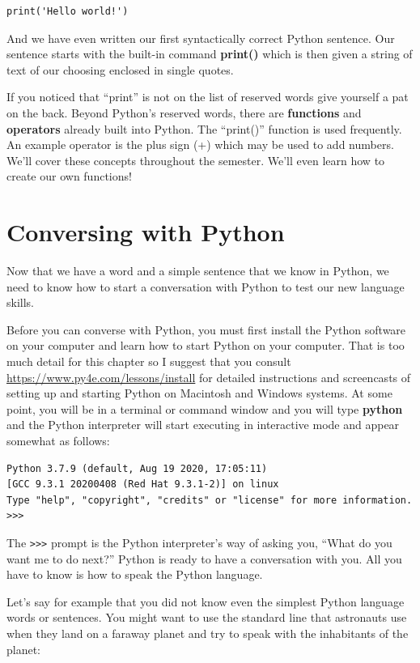 \beforeverb
\begin{verbatim}
print('Hello world!')
\end{verbatim}
\afterverb

And we have even written our first syntactically correct Python sentence.
Our sentence starts with the built-in command {\bf print()} which is then given
a string of text of our choosing enclosed in single quotes. 

If you noticed that ``print'' is not on the list of reserved words give yourself a pat on the back. Beyond Python's reserved words, there are {\bf functions} and {\bf operators} already built into Python. The ``print()'' function is used frequently. An example operator is the plus sign (+) which may be used to add numbers. We'll cover these concepts throughout the semester. We'll even learn how to create our own functions!

\section{Conversing with Python}

Now that we have a word and a simple sentence that we know in Python,
we need to know how to start a conversation with Python to test 
our new language skills.

Before you can converse with Python, you must first install the Python
software on your computer and learn how to start Python on your 
computer.  That is too much detail for this chapter so I suggest
that you consult \url{https://www.py4e.com/lessons/install} for detailed
instructions and screencasts of setting up and starting Python 
on Macintosh and Windows systems.  At some point, you will be in 
a terminal or command window and you will type {\bf python} and 
the Python interpreter will start executing in interactive mode
and appear somewhat as follows:

\beforeverb
\begin{verbatim}
Python 3.7.9 (default, Aug 19 2020, 17:05:11) 
[GCC 9.3.1 20200408 (Red Hat 9.3.1-2)] on linux
Type "help", "copyright", "credits" or "license" for more information.
>>> 
\end{verbatim}
\afterverb
%
The {\tt >>>} prompt is the Python interpreter's way of asking you, ``What
do you want me to do next?''  Python is ready to have a conversation with
you.  All you have to know is how to speak the Python language.

Let's say for example that you did not know even the simplest Python language
words or sentences. You might want to use the standard line that astronauts 
use when they land on a faraway planet and try to speak with the inhabitants
of the planet:


